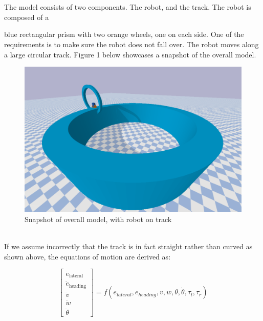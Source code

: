 \documentclass[10pt, letterbox]{article}
\begin{document}
\section{}
\begin{addmargin}[5em]{0em}
The model consists of two components. The robot, and the track. The robot is composed of a \end{addmargin} blue rectangular prism with two orange wheels, one on each side. One of the requirements is to make sure the robot does not fall over. The robot moves along a large circular track. Figure 1 below showcases a snapshot of the overall model.
\\
\begin{figure}[h]
    \centering
    \includegraphics[scale=0.5]{ae353project2fig1}
    \caption{Snapshot of overall model, with robot on track}
    \label{fig:fig1}
\end{figure}
\\
If we assume incorrectly that the track is in fact straight rather than curved as shown above, the equations of motion are derived as:
\begin{center}
\begin{equation}
\begin{bmatrix} 
\dot{e}_\text{lateral} \\ 
\dot{e}_\text{heading} \\ 
\dot{v} \\ 
\dot{w} \\ 
\ddot{\theta} 
\end{bmatrix} = f(e_{lateral}, e_{heading}, v, w, \theta, \dot{\theta}, \tau_{l}, \tau_{r})
\end{equation}
\end{center}
\end{document}

